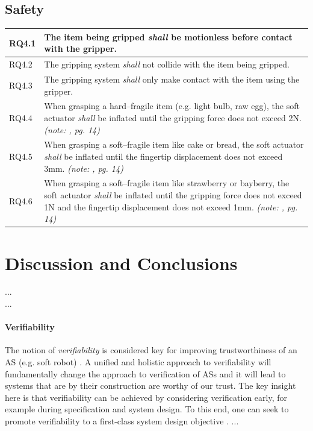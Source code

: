 \documentclass[lettersize,journal]{IEEEtran}
\begin{document}
\subsection{Safety}\label{safety}
\begin{center}
	\begin{tabular}{|p{7mm}|p{72mm}|}
		\hline
		RQ4.1 & The item being gripped \emph{shall} be motionless before contact with the gripper.   \\ 
		\hline
		RQ4.2 & The gripping system \emph{shall} not collide with the item being gripped. \\ 
		\hline
		RQ4.3 & The gripping system \emph{shall} only make contact with the item using the gripper.\\
		\hline
		RQ4.4 & When grasping a hard–fragile item (e.g. light bulb, raw egg), the soft actuator \emph{shall} be inflated until the gripping force does not exceed 2N. \emph{(note: \cite{Cheng2021}, pg. 14)}\\
		\hline
		RQ4.5 & When grasping a soft–fragile item like cake or bread, the soft actuator \emph{shall} be inflated until the fingertip displacement does not exceed 3mm. \emph{(note: \cite{Cheng2021}, pg. 14)}\\
		\hline
		RQ4.6 & When grasping a soft–fragile item like strawberry or bayberry, the soft actuator \emph{shall} be inflated until the gripping force does not exceed 1N and the fingertip displacement does not exceed 1mm. \emph{(note: \cite{Cheng2021}, pg. 14)}\\	[1ex] 
		\hline
	\end{tabular}
\end{center}

\section{Discussion and Conclusions} \label{discussion-conclusions}

...\\

...
\paragraph{Verifiability} 
The notion of \emph{verifiability} is considered key for improving trustworthiness of an AS (e.g. soft robot) \cite{Mousavi2022}. 
A unified and holistic approach to verifiability will fundamentally change the approach to verification of ASs and it will lead to systems that are by their construction are worthy of our trust. 
The key insight here is that verifiability can be achieved by considering verification early, for example during specification and system design. 
To this end, one can seek to promote verifiability to a first-class system design objective \cite{Eder2021}. ...
\end{document}
